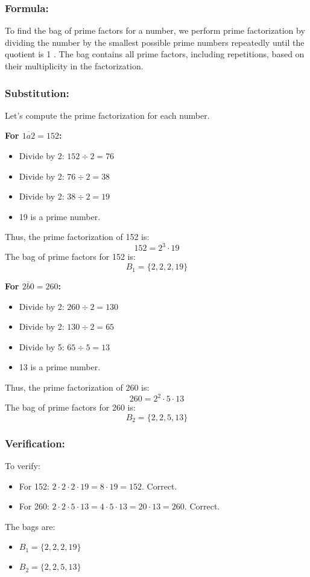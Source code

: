 \documentclass[12pt, a4paper, twoside]{report} %
\begin{document}
\subsubsection*{Formula:}
To find the bag of prime factors for a number, we perform prime factorization by dividing the number by the smallest possible prime numbers repeatedly until the quotient is 1 \cite{burton2010}. The bag contains all prime factors, including repetitions, based on their multiplicity in the factorization.

\subsubsection*{Substitution:}
Let’s compute the prime factorization for each number.

\textbf{For \(\overline{1a2} = 152\):}
\begin{itemize}
  \item Divide by 2: \( 152 \div 2 = 76 \)
  \item Divide by 2: \( 76 \div 2 = 38 \)
  \item Divide by 2: \( 38 \div 2 = 19 \)
  \item 19 is a prime number.
\end{itemize}
Thus, the prime factorization of 152 is:
\[
152 = 2^3 \cdot 19
\]
The bag of prime factors for 152 is:
\[
B_1 = \{2, 2, 2, 19\}
\]

\textbf{For \(\overline{2b0} = 260\):}
\begin{itemize}
  \item Divide by 2: \( 260 \div 2 = 130 \)
  \item Divide by 2: \( 130 \div 2 = 65 \)
  \item Divide by 5: \( 65 \div 5 = 13 \)
  \item 13 is a prime number.
\end{itemize}
Thus, the prime factorization of 260 is:
\[
260 = 2^2 \cdot 5 \cdot 13
\]
The bag of prime factors for 260 is:
\[
B_2 = \{2, 2, 5, 13\}
\]

\subsubsection*{Verification:}
To verify:
\begin{itemize}
  \item For 152: \( 2 \cdot 2 \cdot 2 \cdot 19 = 8 \cdot 19 = 152 \). Correct.
  \item For 260: \( 2 \cdot 2 \cdot 5 \cdot 13 = 4 \cdot 5 \cdot 13 = 20 \cdot 13 = 260 \). Correct.
\end{itemize}
The bags are:
\begin{itemize}
  \item \( B_1 = \{2, 2, 2, 19\} \)
  \item \( B_2 = \{2, 2, 5, 13\} \)
\end{itemize}
\end{document}

